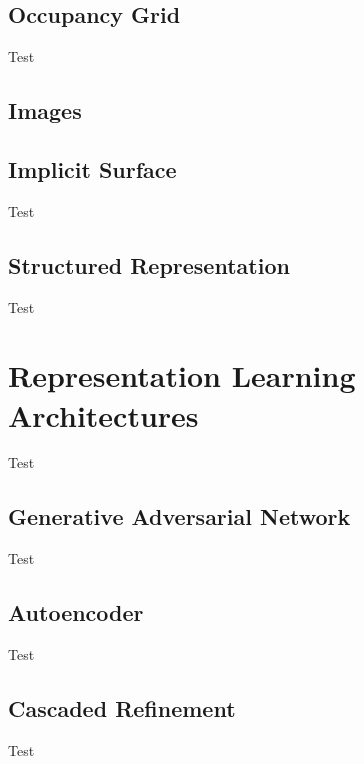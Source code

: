 \subsection{Occupancy Grid}
\label{subsec:occupancy_grid}

Test

\subsection{Images}

\subsection{Implicit Surface}
\label{subsec:implicit_surface}

Test

\subsection{Structured Representation}
\label{subsec:structured_representation}

Test


\section{Representation Learning Architectures}
\label{sec:representation_learning_architectures}

Test

\subsection{Generative Adversarial Network}
\label{subsec:generative_adversarial_networks}

Test

\subsection{Autoencoder}
\label{subsec:autoencoders}

Test

\subsection{Cascaded Refinement}
\label{subsec:cascaded_refinement}

Test